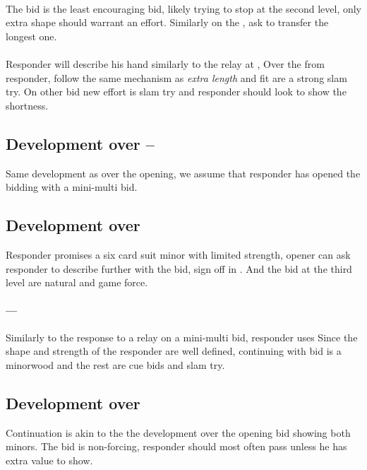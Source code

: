 \paragraph{}
The \bid{2\CS} bid is the least encouraging bid, likely trying to stop at the second level, only extra shape should warrant an effort.
Similarly on the \bid{3\NT}, \bid{4\CS} ask to transfer the longest one.
\paragraph{}
Responder will describe his hand similarly to the relay at \bid{2\CS},
Over the \bid{2\HS/\SpS} from responder, \bid{2\NT} follow the same mechanism as \emph{extra length} and fit are a strong slam try. On other bid new effort is slam try and responder should look to show the shortness.
\subsection{Development over \bid{1\CS}–\bid{2\DS}}
Same development as over the \bid{2\DS} opening, we assume that responder has opened the bidding with a mini-multi bid.
\subsection{Development over }
Responder promises a six card suit minor with limited strength, opener can ask responder to describe further with the \bid{2\SpS} bid, sign off in . And the bid at the third level are natural and game force.
\paragraph{\bid{1\CS}–\bid{2\HS}–\bid{2\SpS}}
Similarly to the response to a relay on a mini-multi bid, responder uses
Since the shape and strength of the responder are well defined, continuing with  bid is a minorwood and the rest are cue bids and slam try.
\subsection{Development over }
Continuation is akin to the the development over the \bid{2\NT} opening bid showing both minors. The \bid{2\NT} bid is non-forcing, responder should most often pass unless he has extra value to show.